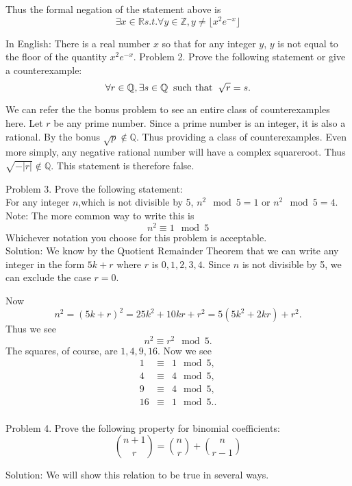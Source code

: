 \documentclass[16 pt]{amsart}
\theoremstyle{definition}
\theoremstyle{remark}
\numberwithin{equation}{subsection}
\newcommand{\R}{\mathbb{R}}
\newcommand{\Z}{\mathbb{Z}}
\newcommand{\Q}{\mathbb{Q}}
\begin{document}
Thus the formal negation of the statement above is
\[
\exists x\in\R s.t. \forall y\in\Z, y\neq\lfloor x^2e^{-x}\rfloor
\]

In English: There is a real number $x$ so that for any integer $y$, $y$ is not equal to the floor of the quantity $x^2e^{-x}$.
\newpage
Problem 2.
Prove the following statement or give a counterexample:
\[
\forall r\in\Q, \exists s\in\Q \hspace{2mm} \text{such that} \hspace{2mm} \sqrt{r} = s.
\]

We can refer the the bonus problem to see an entire class of counterexamples here.  Let $r$ be any prime number.  Since a prime number is an integer, it is also a rational.  By the bonus $\sqrt{p}\notin\Q$.  Thus providing a class of counterexamples.  Even more simply, any negative rational number will have a complex squareroot.  Thus $\sqrt{-|r|}\notin\Q$.  This statement is therefore false.


\newpage
Problem 3.
Prove the following statement:\\
For any integer $n$,which is not divisible by 5, $n^2\mod{5} = 1$ or $n^2\mod{5}=4$. \\
Note: The more common way to write this is
\[
n^2 \equiv 1\mod{5}
\]
Whichever notation you choose for this problem is acceptable.\\

Solution: We know by the Quotient Remainder Theorem that we can write any integer in the form $5k+r$ where $r$ is $0,1,2,3,4$.  Since $n$ is not divisible by 5, we can exclude the case $r=0$.

Now 
\[
n^2 = (5k+r)^2 = 25k^2+10kr+r^2 = 5(5k^2+2kr)+r^2.
\]
Thus we see
\[
n^2\equiv r^2 \mod{5}.
\]
The squares, of course, are $1,4,9,16$.  Now we see
\begin{eqnarray*}
1& \equiv & 1\mod{5},\\
4& \equiv & 4\mod{5},\\
9& \equiv & 4\mod{5},\\
16& \equiv & 1\mod{5}..\\
\end{eqnarray*}




\newpage
Problem 4.
Prove the following property for binomial coefficients:
\[
{n+1\choose r} = {n\choose r}+{n\choose r-1} 
\]

Solution: We will show this relation to be true in several ways.\\
\end{document}
